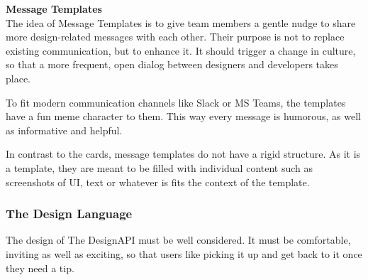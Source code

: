 \textbf{Message Templates}\\
The idea of Message Templates is to give team members a gentle nudge to share more design-related
messages with each other. Their purpose is not to replace existing communication, but to enhance it.
It should trigger a change in culture, so that a more frequent, open dialog between designers and
developers takes place.

To fit modern communication channels like Slack or MS Teams, the templates have a fun meme character
to them. This way every message is humorous, as well as informative and helpful.

In contrast to the cards, message templates do not have a rigid structure. As it is a template, they
are meant to be filled with individual content such as screenshots of UI, text or whatever is fits
the context of the template.

\subsubsection{The Design Language}


% 


The design of The DesignAPI must be well considered. It must be comfortable, inviting as well as
exciting, so that users like picking it up and get back to it once they need a tip.

